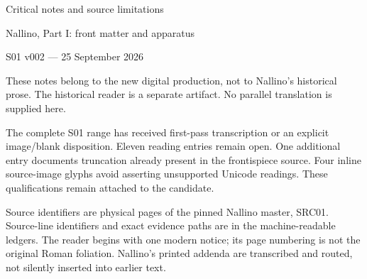 \documentclass[11pt]{article}
\begin{document}
\begin{center}{\Large Critical notes and source limitations}\par
{\large Nallino, Part I: front matter and apparatus}\par
S01 v002 — 25 September 2026\end{center}
These notes belong to the new digital production, not to Nallino's historical prose. The historical reader is a separate artifact. No parallel translation is supplied here.

The complete S01 range has received first-pass transcription or an explicit image/blank disposition. Eleven reading entries remain open. One additional entry documents truncation already present in the frontispiece source. Four inline source-image glyphs avoid asserting unsupported Unicode readings. These qualifications remain attached to the candidate.

Source identifiers are physical pages of the pinned Nallino master, SRC01. Source-line identifiers and exact evidence paths are in the machine-readable ledgers. The reader begins with one modern notice; its page numbering is not the original Roman foliation. Nallino's printed addenda are transcribed and routed, not silently inserted into earlier text.
\end{document}
